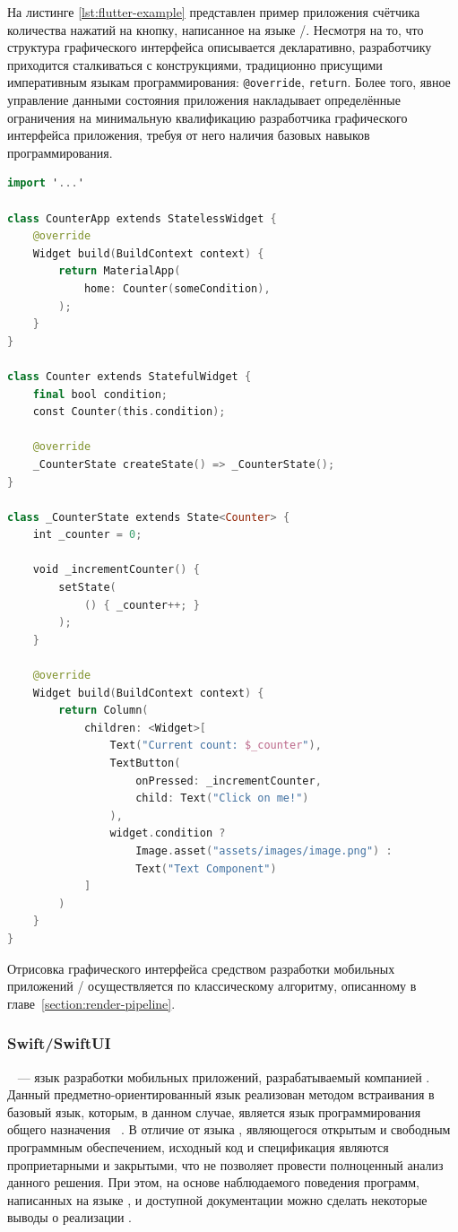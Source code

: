 На листинге \ref{lst:flutter-example} представлен пример приложения счётчика
количества нажатий на кнопку, написанное на языке /.
Несмотря на то, что структура графического интерфейса описывается
декларативно, разработчику приходится сталкиваться с конструкциями,
традиционно присущими императивным языкам программирования:
\texttt{@override}, \texttt{return}. Более того, явное управление
данными состояния приложения накладывает определённые ограничения на
минимальную квалификацию разработчика графического интерфейса приложения,
требуя от него наличия базовых навыков программирования.
\begin{lstlisting}[language=Swift,caption=Счётчик нажатия кнопки на языке
\name{Dart}/\name{Flutter},label={lst:flutter-example}]
import '...'

class CounterApp extends StatelessWidget {
    @override
    Widget build(BuildContext context) {
        return MaterialApp(
            home: Counter(someCondition),
        );
    }
}

class Counter extends StatefulWidget {
    final bool condition;
    const Counter(this.condition);
    
    @override
    _CounterState createState() => _CounterState();
}

class _CounterState extends State<Counter> {
    int _counter = 0;
    
    void _incrementCounter() {
        setState(
            () { _counter++; }
        );
    }
    
    @override
    Widget build(BuildContext context) {
        return Column(
            children: <Widget>[
                Text("Current count: $_counter"),
                TextButton(
                    onPressed: _incrementCounter,
                    child: Text("Click on me!")
                ),
                widget.condition ?
                    Image.asset("assets/images/image.png") :
                    Text("Text Component")
            ]
        )
    }
}
\end{lstlisting}

Отрисовка графического интерфейса средством разработки мобильных
приложений / осуществляется по классическому
алгоритму, описанному в главе~\ref{section:render-pipeline}.

\subsubsection*{Swift/SwiftUI}
~\cite{swiftui-homepage} --- язык разработки мобильных
приложений, разрабатываемый компанией . Данный
предметно-ориентированный язык реализован методом встраивания в базовый
язык, которым, в данном случае, является язык программирования общего
назначения ~\cite{swift-homepage}. В отличие от языка
, являющегося открытым и свободным программным обеспечением,
исходный код и спецификация  являются проприетарными и
закрытыми, что не позволяет провести полноценный анализ данного решения.
При этом, на основе наблюдаемого поведения программ, написанных на языке
, и доступной документации можно сделать некоторые выводы о
реализации .

